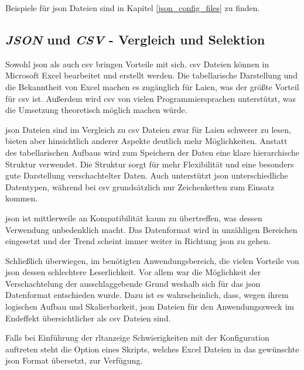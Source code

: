 Beispiele für \ac{json} Dateien sind in Kapitel \ref{json_config_files} zu finden.

\subsection{\textit{JSON} und \textit{CSV} - Vergleich und Selektion} \label{json_vs_csv}
Sowohl \ac{json} als auch \ac{csv} bringen Vorteile mit sich. 
\ac{csv} Dateien können in Microsoft Excel bearbeitet und erstellt werden. Die tabellarische Darstellung und die Bekanntheit von Excel machen es zugänglich für Laien, was der größte Vorteil für \ac{csv} ist. Außerdem wird \ac{csv} von vielen Programmiersprachen unterstützt, was die Umsetzung theoretisch möglich machen würde. 

\ac{json} Dateien sind im Vergleich zu \ac{csv} Dateien zwar für Laien schwerer zu lesen, bieten aber hinsichtlich anderer Aspekte deutlich mehr Möglichkeiten. Anstatt des tabellarischen Aufbaus wird zum Speichern der Daten eine klare hierarchische Struktur verwendet. Die Struktur sorgt für mehr Flexibilität und eine besonders gute Darstellung verschachtelter Daten. Auch unterstützt \ac{json} unterschiedliche Datentypen, während bei \ac{csv} grundsätzlich nur Zeichenketten zum Einsatz kommen.

\ac{json} ist mittlerweile an Kompatibilität kaum zu übertreffen, was dessen Verwendung unbedenklich macht. Das Datenformat wird in unzähligen Bereichen eingesetzt und der Trend scheint immer weiter in Richtung \ac{json} zu gehen.

Schließlich überwiegen, im benötigten Anwendungsbereich, die vielen Vorteile von \ac{json} dessen schlechtere Leserlichkeit. Vor allem war die Möglichkeit der Verschachtelung der ausschlaggebende Grund weshalb sich für das \ac{json} Datenformat entschieden wurde. Dazu ist es wahrscheinlich, dass, wegen ihrem logischen Aufbau und  Skalierbarkeit, \ac{json} Dateien für den Anwendungszweck im Endeffekt übersichtlicher als \ac{csv} Dateien sind.

Falls bei Einführung der \ac{rltanzeige} Schwierigkeiten mit der Konfiguration auftreten steht \zB die Option eines Skripts, welches Excel Dateien in das gewünschte \ac{json} Format übersetzt, zur Verfügung.


